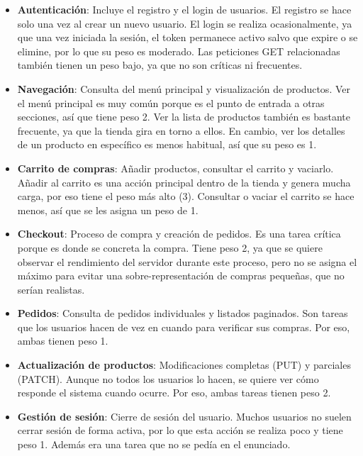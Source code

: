\documentclass[10pt]{book}
\begin{document}
\begin{itemize}
    \item \textbf{Autenticación}: Incluye el registro y el login de usuarios.  
    El registro se hace solo una vez al crear un nuevo usuario. El login se realiza ocasionalmente, ya que una vez iniciada la sesión, el token permanece activo salvo que expire o se elimine, por lo que su peso es moderado. Las peticiones GET relacionadas también tienen un peso bajo, ya que no son críticas ni frecuentes.

    \item \textbf{Navegación}: Consulta del menú principal y visualización de productos.  
    Ver el menú principal es muy común porque es el punto de entrada a otras secciones, así que tiene peso 2. Ver la lista de productos también es bastante frecuente, ya que la tienda gira en torno a ellos. En cambio, ver los detalles de un producto en específico es menos habitual, así que su peso es 1.

    \item \textbf{Carrito de compras}: Añadir productos, consultar el carrito y vaciarlo.  
    Añadir al carrito es una acción principal dentro de la tienda y genera mucha carga, por eso tiene el peso más alto (3). Consultar o vaciar el carrito se hace menos, así que se les asigna un peso de 1.

    \item \textbf{Checkout}: Proceso de compra y creación de pedidos.  
    Es una tarea crítica porque es donde se concreta la compra. Tiene peso 2, ya que se quiere observar el rendimiento del servidor durante este proceso, pero no se asigna el máximo para evitar una sobre-representación de compras pequeñas, que no serían realistas.

    \item \textbf{Pedidos}: Consulta de pedidos individuales y listados paginados.  
    Son tareas que los usuarios hacen de vez en cuando para verificar sus compras. Por eso, ambas tienen peso 1.

    \item \textbf{Actualización de productos}: Modificaciones completas (PUT) y parciales (PATCH).  
    Aunque no todos los usuarios lo hacen, se quiere ver cómo responde el sistema cuando ocurre. Por eso, ambas tareas tienen peso 2.

    \item \textbf{Gestión de sesión}: Cierre de sesión del usuario.  
    Muchos usuarios no suelen cerrar sesión de forma activa, por lo que esta acción se realiza poco y tiene peso 1. Además era una tarea que no se pedía en el enunciado.
\end{itemize}
\end{document}
